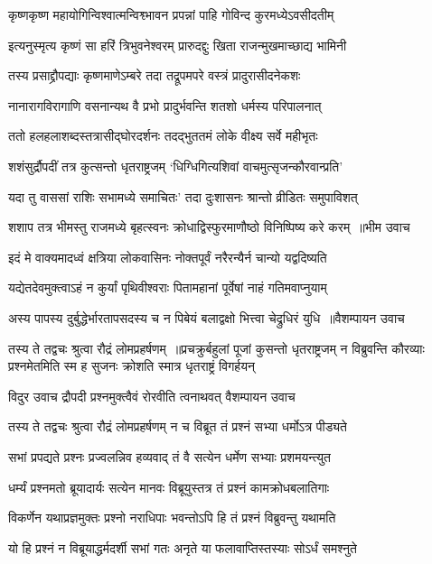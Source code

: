 \twolineshloka
{कृष्णकृष्ण महायोगिन्विश्वात्मन्विश्व्भावन}
{प्रपन्नां पाहि गोविन्द कुरमध्येऽवसीदतीम्}


\twolineshloka
{इत्यनुस्मृत्य कृष्णं सा हरिं त्रिभुवनेश्वरम्}
{प्रारुदद्दुः खिता राजन्मुखमाच्छाद्य भामिनी}


\twolineshloka
{तस्य प्रसाद्द्रौपद्याः कृष्णमाणेऽम्बरे तदा}
{तद्रूपमपरे वस्त्रं प्रादुरासीदनेकशः}


\twolineshloka
{नानारागविरागाणि वसनान्यथ वै प्रभो}
{प्रादुर्भवन्ति शतशो धर्मस्य परिपालनात्}


\twolineshloka
{ततो हलहलाशब्दस्तत्रासीद्घोरदर्शनः}
{तदद्भुततमं लोके वीक्ष्य सर्वे महीभृतः}


\twolineshloka
{शशंसुर्द्रौपदीं तत्र कुत्सन्तो धृतराष्ट्रजम्}
{`धिग्धिगित्यशिवां वाचमुत्सृजन्कौरवान्प्रति'}


\twolineshloka
{यदा तु वाससां राशिः सभामध्ये समाचितः'}
{तदा दुःशासनः श्रान्तो व्रीडितः समुपाविशत्}


\twolineshloka
{शशाप तत्र भीमस्तु राजमध्ये बृहत्स्वनः}
{क्रोधाद्विस्फुरमाणौष्ठो विनिष्पिष्य करे करम् ॥भीम उवाच}


\twolineshloka
{इदं मे वाक्यमादध्वं क्षत्रिया लोकवासिनः}
{नोक्तपूर्वं नरैरन्यैर्न चान्यो यद्वदिष्यति}


\twolineshloka
{यद्येतदेवमुक्त्वाऽहं न कुर्यां पृथिवीश्वराः}
{पितामहानां पूर्वेषां नाहं गतिमवाप्नुयाम्}


\twolineshloka
{अस्य पापस्य दुर्बुद्धेर्भारतापसदस्य च}
{न पिबेयं बलाद्वक्षो भित्त्वा चेद्रुधिरं युधि ॥वैशम्पायन उवाच}


तस्य ते तद्वचः श्रुत्वा रौद्रं लोमप्रहर्षणम् ॥प्रचक्रुर्बहुलां पूजां कुसन्तो धृतराष्ट्रजम्
\twolineshloka
{न विब्रुवन्ति कौरव्याः प्रश्नमेतमिति स्म ह}
{सुजनः क्रोशति स्मात्र धृतराष्ट्रं विगर्हयन्}


\threelineshloka
{विदुर उवाच}
{द्रौपदी प्रश्नमुक्त्वैवं रोरवीति त्वनाथवत्}
{वैशम्पायन उवाच}


\twolineshloka
{तस्य ते तद्वचः श्रुत्वा रौद्रं लोमप्रहर्षणम्}
{न च विब्रूत तं प्रश्नं सभ्या धर्मोऽत्र पीड्यते}


\twolineshloka
{सभां प्रपद्यते प्रश्नः प्रज्वलन्निव हव्यवाद्}
{तं वै सत्येन धर्मेण सभ्याः प्रशमयन्त्युत}


\twolineshloka
{धर्म्यं प्रश्नमतो ब्रूयादार्यः सत्येन मानवः}
{विब्रूयुस्तत्र तं प्रश्नं कामक्रोधबलातिगाः}


\twolineshloka
{विकर्णेन यथाप्रज्ञमुक्तः प्रश्नो नराधिपाः}
{भवन्तोऽपि हि तं प्रश्नं विब्रुवन्तु यथामति}


\twolineshloka
{यो हि प्रश्नं न विब्रूयाद्धर्मदर्शी सभां गतः}
{अनृते या फलावाप्तिस्तस्याः सोऽर्धं समश्नुते}


